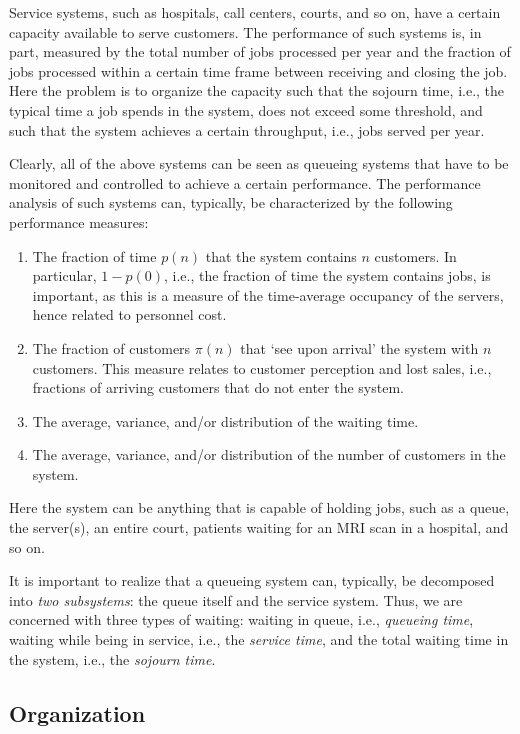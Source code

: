 \documentclass[companion]{subfiles}
\begin{document}
Service systems, such as hospitals, call centers, courts, and so on, have a certain capacity available to serve customers.
The performance of such systems is, in part, measured by the total number of jobs processed per year and the fraction of jobs processed within a certain time frame between receiving and closing the job.
Here the problem is to organize the capacity such that the sojourn time, i.e., the typical time a job spends in the system, does not exceed some threshold, and such that the system achieves a certain throughput, i.e., jobs served per year.

Clearly, all of the above systems can be seen as queueing systems that have to be monitored and controlled to achieve a certain performance.
The performance analysis of such systems can, typically, be characterized by the following performance measures:
\begin{enumerate}
\item The fraction of time $p(n)$ that the system contains $n$ customers.
 In particular, $1-p(0)$, i.e., the fraction of time the system contains jobs, is important, as this is a measure of the time-average occupancy of the servers, hence related to personnel cost.
\item The fraction of customers $\pi(n)$ that `see upon arrival' the system with $n$ customers.
  This measure relates to customer perception and lost sales, i.e., fractions of arriving customers that do not enter the system.
\item The average, variance, and/or distribution of the waiting time.
\item The average, variance, and/or distribution of the number of customers in the system.\
\end{enumerate}
Here the system can be anything that is capable of holding jobs, such as a queue, the server(s), an entire court, patients waiting for an MRI scan in a hospital, and so on.

It is important to realize that a queueing system can, typically, be decomposed into \emph{two subsystems}: the queue itself and the service system.
Thus, we are concerned with three types of waiting: waiting in queue, i.e., \emph{queueing time}, waiting while being in service, i.e., the \emph{service time}, and the total waiting time in the system, i.e., the \emph{sojourn time}.

\subsection*{Organization}
\end{document}
